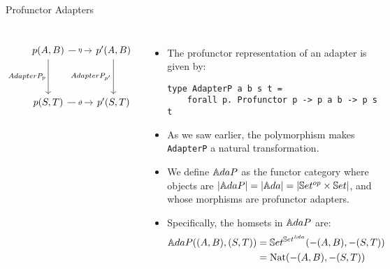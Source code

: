 \begin{frame}[fragile]{Profunctor Adapters}
	\begin{columns}
			\[\begin{tikzcd}
				{p(A,B)} & {p'(A,B)} \\
				\\
				{p(S,T)} & {p'(S,T)}
				\arrow["\eta"{description}, from=1-1, to=1-2]
				\arrow["{AdapterP_p}"', from=1-1, to=3-1]
				\arrow["{AdapterP_{p'}}"', from=1-2, to=3-2]
				\arrow["\vartheta"{description}, from=3-1, to=3-2]
			\end{tikzcd}\]
		\begin{itemize}
			\item The profunctor representation of an adapter is given by:
			\begin{lstlisting}
type AdapterP a b s t =
	forall p. Profunctor p -> p a b -> p s t
			\end{lstlisting}
			\pause\item As we saw earlier, the polymorphism makes \texttt{AdapterP} a natural transformation.
			\pause\item We define $\mathbb{A}daP$ as the functor category where objects are $|\mathbb{A}daP| = |{\mathbb{A}da}| = |\mathbb{S}et^{op} \times \mathbb{S}et|$, and whose morphisms are profunctor adapters.
			\pause\item Specifically, the homsets in $\mathbb{A}daP$ are:
			\begin{align*}
				\mathbb{A}daP ((A,B),(S,T)) &= \mathbb{S}et^{\mathbb{S}et^{{\mathbb{A}da}}}(-(A, B), -(S, T))\\
									 &= \text{Nat}(-(A, B), -(S, T))\\
			\end{align*}
		\end{itemize}
	\end{columns}
\end{frame}
\iffalse
